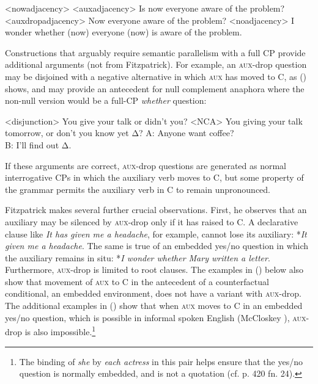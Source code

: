 \documentclass[output=paper]{langscibook}
\begin{document}
\pex<nowadjacency>
\a<auxadjacency> \ljudge{*}Is now everyone aware of the problem?
\a<auxdropadjacency> \ljudge{*}Now everyone aware of the problem?
\a<noadjacency> I wonder whether (now) everyone (now) is aware of the problem.
\xe

\noindent Constructions that arguably require semantic parallelism with a full CP provide additional arguments (not from Fitzpatrick). For example, an \textsc{aux-}drop question may be disjoined with a negative alternative in which \textsc{aux} has moved to C, as () shows, and may provide an antecedent for null complement anaphora where the non-null version would be a full-CP \textit{whether} question:

\pex<disjunction>
You give your talk or didn't you?
\xe
\pex[aboveexskip=0pt]<NCA>
\a You giving your talk tomorrow, or don't you know yet Δ?
\a A: Anyone want coffee? \\B: I'll find out Δ.
\xe

\noindent If these arguments are correct, \textsc{aux}-drop questions are generated as normal interrogative CPs in which the auxiliary verb moves to C, but some property of the grammar permits the auxiliary verb in C to remain unpronounced. 

Fitzpatrick makes several further crucial observations. First, he observes that an auxiliary may be silenced by \textsc{aux}-drop only if it has raised to C. A declarative clause like \textit{It has given me a headache}, for example, cannot lose its auxiliary: *\textit{It given me a headache}. The same is true of an embedded yes/no question in which the auxiliary remains in situ: *\textit{I wonder whether Mary written a letter}. Furthermore, \textsc{aux}-drop is limited to root clauses. The examples in () below also show that movement of \textsc{aux} to C in the antecedent of a counterfactual conditional, an embedded environment, does not have a variant with \textsc{aux}-drop. The additional examples in () show that when \textsc{aux} moves to C in an embedded yes/no question, which is possible in informal spoken English (McCloskey \citeyear{McCloskey:2006}), \textsc{aux}-drop is also impossible.\footnote{The binding of \textit{she} by \textit{each actress} in this pair helps ensure that the yes/no question is normally embedded, and is not a quotation (cf. \citealt{fitzpatrick2006deletion} p. 420 fn. 24).} 
\end{document}
